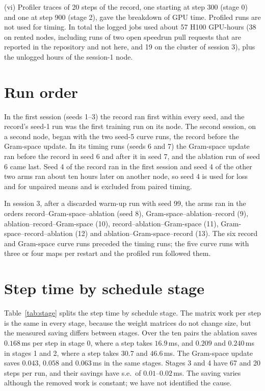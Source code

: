 \documentclass{article}
\begin{document}
(vi) Profiler traces of 20 steps of the record, one starting at step 300 (stage 0) and one at step 900 (stage 2), gave the breakdown of GPU time. Profiled runs are not used for timing. In total the logged jobs used about 57 H100 GPU-hours (38 on rented nodes, including runs of two open speedrun pull requests that are reported in the repository and not here, and 19 on the cluster of session 3), plus the unlogged hours of the session-1 node.


\section{Run order}\label{app:order}
In the first session (seeds 1--3) the record ran first within every seed, and the record's seed-1 run was the first training run on its node. The second session, on a second node, began with the two seed-5 curve runs, the record before the Gram-space update. In its timing runs (seeds 6 and 7) the Gram-space update ran before the record in seed 6 and after it in seed 7, and the ablation run of seed 6 came last. Seed 4 of the record ran in the first session and seed 4 of the other two arms ran about ten hours later on another node, so seed 4 is used for loss and for unpaired means and is excluded from paired timing.

In session 3, after a discarded warm-up run with seed 99, the arms ran in the orders record--Gram-space--ablation (seed 8), Gram-space--ablation--record (9), ablation--record--Gram-space (10), record--ablation--Gram-space (11), Gram-space--record--ablation (12) and ablation--Gram-space--record (13). The six record and Gram-space curve runs preceded the timing runs; the five curve runs with three or four maps per restart and the profiled run followed them.

\section{Step time by schedule stage}\label{app:stage}
Table~\ref{tab:stage} splits the step time by schedule stage. The matrix work per step is the same in every stage, because the weight matrices do not change size, but the measured saving differs between stages. Over the ten pairs the ablation saves $0.168$\,ms per step in stage 0, where a step takes $16.9$\,ms, and $0.209$ and $0.240$\,ms in stages 1 and 2, where a step takes $30.7$ and $46.6$\,ms. The Gram-space update saves $0.043$, $0.058$ and $0.063$\,ms in the same stages. Stages 3 and 4 have 67 and 20 steps per run, and their savings have s.e.\ of $0.01$--$0.02$\,ms. The saving varies although the removed work is constant; we have not identified the cause.
\end{document}
